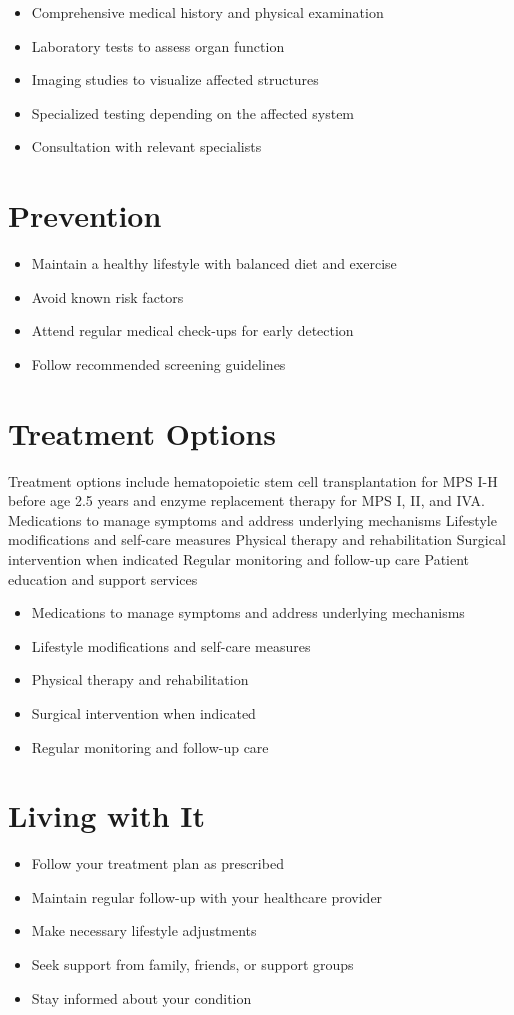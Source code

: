 \begin{itemize}[noitemsep]
  \item Comprehensive medical history and physical examination
  \item Laboratory tests to assess organ function
  \item Imaging studies to visualize affected structures
  \item Specialized testing depending on the affected system
  \item Consultation with relevant specialists
\end{itemize}
\section{Prevention}
\begin{itemize}[noitemsep]
  \item Maintain a healthy lifestyle with balanced diet and exercise
  \item Avoid known risk factors
  \item Attend regular medical check-ups for early detection
  \item Follow recommended screening guidelines
\end{itemize}
\section{Treatment Options}
Treatment options include hematopoietic stem cell transplantation for MPS I-H before age 2.5 years and enzyme replacement therapy for MPS I, II, and IVA. Medications to manage symptoms and address underlying mechanisms Lifestyle modifications and self-care measures Physical therapy and rehabilitation Surgical intervention when indicated Regular monitoring and follow-up care Patient education and support services

\begin{itemize}[noitemsep]
  \item Medications to manage symptoms and address underlying mechanisms
  \item Lifestyle modifications and self-care measures
  \item Physical therapy and rehabilitation
  \item Surgical intervention when indicated
  \item Regular monitoring and follow-up care
\end{itemize}
\section{Living with It}
\begin{itemize}[noitemsep]
  \item Follow your treatment plan as prescribed
  \item Maintain regular follow-up with your healthcare provider
  \item Make necessary lifestyle adjustments
  \item Seek support from family, friends, or support groups
  \item Stay informed about your condition
\end{itemize}
